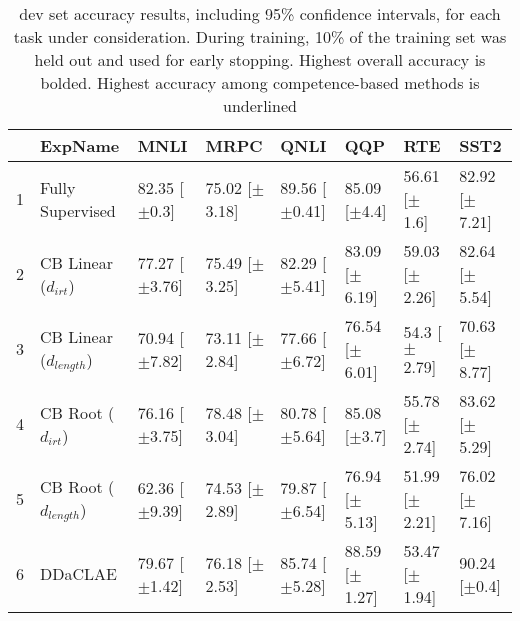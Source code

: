 \begin{table*}[ht]
\centering
\begingroup\small
\begin{tabular}{rlllllll}
  \toprule
 & ExpName & MNLI & MRPC & QNLI & QQP & RTE & SST2 \\ 
  \midrule
1 & Fully Supervised & 82.35 [$\pm$0.3] & 75.02 [$\pm$3.18] & 89.56 [$\pm$0.41] & 85.09 [$\pm$4.4] & 56.61 [$\pm$1.6] & 82.92 [$\pm$7.21] \\ 
  2 & CB Linear ($d_{irt}$) & 77.27 [$\pm$3.76] & 75.49 [$\pm$3.25] & 82.29 [$\pm$5.41] & 83.09 [$\pm$6.19] & 59.03 [$\pm$2.26] & 82.64 [$\pm$5.54] \\ 
  3 & CB Linear ($d_{length}$) & 70.94 [$\pm$7.82] & 73.11 [$\pm$2.84] & 77.66 [$\pm$6.72] & 76.54 [$\pm$6.01] & 54.3 [$\pm$2.79] & 70.63 [$\pm$8.77] \\ 
  4 & CB Root ($d_{irt}$) & 76.16 [$\pm$3.75] & 78.48 [$\pm$3.04] & 80.78 [$\pm$5.64] & 85.08 [$\pm$3.7] & 55.78 [$\pm$2.74] & 83.62 [$\pm$5.29] \\ 
  5 & CB Root ($d_{length}$) & 62.36 [$\pm$9.39] & 74.53 [$\pm$2.89] & 79.87 [$\pm$6.54] & 76.94 [$\pm$5.13] & 51.99 [$\pm$2.21] & 76.02 [$\pm$7.16] \\ 
  6 & DDaCLAE & 79.67 [$\pm$1.42] & 76.18 [$\pm$2.53] & 85.74 [$\pm$5.28] & 88.59 [$\pm$1.27] & 53.47 [$\pm$1.94] & 90.24 [$\pm$0.4] \\ 
   \bottomrule
\end{tabular}
\endgroup
\caption{dev set accuracy results, including 95\% confidence intervals, for each task under consideration. During training, 10\% of the training set was held out and used for early stopping. Highest overall accuracy is bolded. Highest accuracy among competence-based methods is underlined} 
\label{tab:acc_bert-False}
\end{table*}
